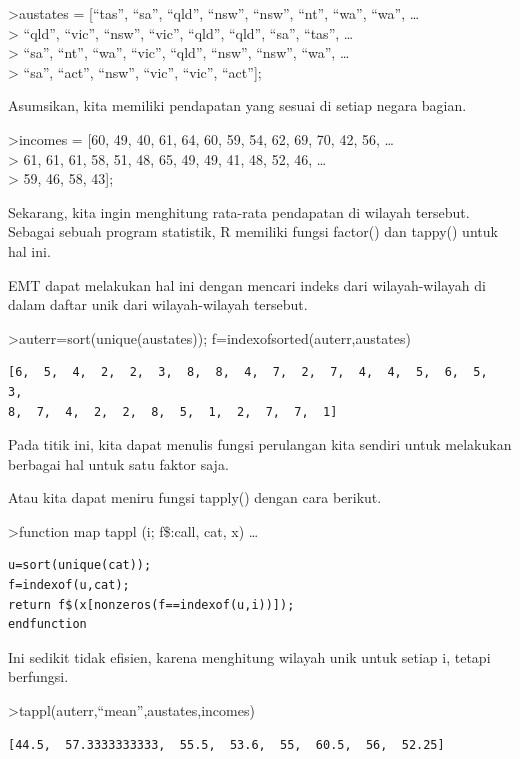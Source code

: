 \documentclass[
]{book}
\begin{document}
\textgreater austates = {[}``tas'', ``sa'', ``qld'', ``nsw'', ``nsw'', ``nt'', ``wa'', ``wa'', \ldots{}\\
\textgreater{} ``qld'', ``vic'', ``nsw'', ``vic'', ``qld'', ``qld'', ``sa'', ``tas'', \ldots{}\\
\textgreater{} ``sa'', ``nt'', ``wa'', ``vic'', ``qld'', ``nsw'', ``nsw'', ``wa'', \ldots{}\\
\textgreater{} ``sa'', ``act'', ``nsw'', ``vic'', ``vic'', ``act''{]};

Asumsikan, kita memiliki pendapatan yang sesuai di setiap negara bagian.

\textgreater incomes = {[}60, 49, 40, 61, 64, 60, 59, 54, 62, 69, 70, 42, 56, \ldots{}\\
\textgreater{} 61, 61, 61, 58, 51, 48, 65, 49, 49, 41, 48, 52, 46, \ldots{}\\
\textgreater{} 59, 46, 58, 43{]};

Sekarang, kita ingin menghitung rata-rata pendapatan di wilayah tersebut. Sebagai sebuah program statistik, R memiliki fungsi factor() dan tappy() untuk hal ini.

EMT dapat melakukan hal ini dengan mencari indeks dari wilayah-wilayah di dalam daftar unik dari wilayah-wilayah tersebut.

\textgreater auterr=sort(unique(austates)); f=indexofsorted(auterr,austates)

\begin{verbatim}
[6,  5,  4,  2,  2,  3,  8,  8,  4,  7,  2,  7,  4,  4,  5,  6,  5,  3,
8,  7,  4,  2,  2,  8,  5,  1,  2,  7,  7,  1]
\end{verbatim}

Pada titik ini, kita dapat menulis fungsi perulangan kita sendiri untuk melakukan berbagai hal untuk satu faktor saja.

Atau kita dapat meniru fungsi tapply() dengan cara berikut.

\textgreater function map tappl (i; f\$:call, cat, x) \ldots{}

\begin{verbatim}
u=sort(unique(cat));
f=indexof(u,cat);
return f$(x[nonzeros(f==indexof(u,i))]);
endfunction
\end{verbatim}

Ini sedikit tidak efisien, karena menghitung wilayah unik untuk setiap i, tetapi berfungsi.

\textgreater tappl(auterr,``mean'',austates,incomes)

\begin{verbatim}
[44.5,  57.3333333333,  55.5,  53.6,  55,  60.5,  56,  52.25]
\end{verbatim}
\end{document}
